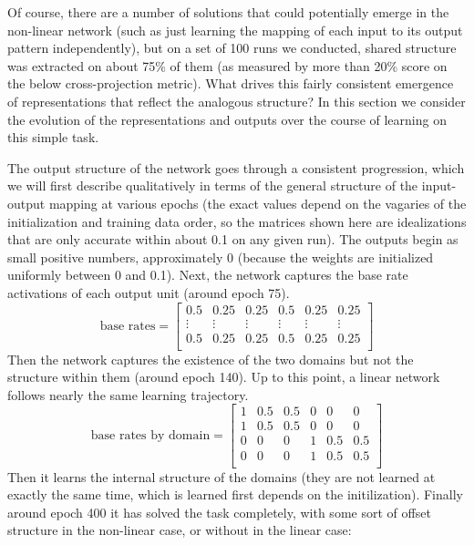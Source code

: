 \documentclass[10pt,letterpaper]{article}
\begin{document}
Of course, there are a number of solutions that could potentially emerge in the non-linear network (such as just learning the mapping of each input to its output pattern independently), but on a set of 100 runs we conducted, shared structure was extracted on about 75\% of them (as measured by more than 20\% score on the below cross-projection metric). What drives this fairly consistent emergence of representations that reflect the analogous structure? In this section we consider the evolution of the representations and outputs over the course of learning on this simple task. \par 
The output structure of the network goes through a consistent progression, which we will first describe qualitatively in terms of the general structure of the input-output mapping at various epochs (the exact values depend on the vagaries of the initialization and training data order, so the matrices shown here are idealizations that are only accurate within about 0.1 on any given run). The outputs begin as small positive numbers, approximately 0 (because the weights are initialized uniformly between 0 and 0.1). Next, the network captures the base rate activations of each output unit (around epoch 75).
{ 
\[ 
\text{base rates} = \left[ \begin{matrix} 
0.5 & 0.25 & 0.25 & 0.5 & 0.25 & 0.25 \\
\vdots & \vdots &\vdots &\vdots &\vdots &\vdots \\
 0.5 & 0.25 & 0.25 & 0.5 & 0.25 & 0.25\\
\end{matrix}  \right] 
\] 
}
Then the network captures the existence of the two domains but not the structure within them (around epoch 140). Up to this point, a linear network follows nearly the same learning trajectory.
{ 
\[
\text{base rates by domain} = \left[ \begin{matrix} 
1 & 0.5 & 0.5 & 0 & 0 & 0 \\
1 & 0.5 & 0.5 & 0 & 0 & 0 \\
0 & 0 & 0 & 1 & 0.5 & 0.5  \\
0 & 0 & 0 & 1 & 0.5 & 0.5  \\
\end{matrix}  \right] 
\] 
}
Then it learns the internal structure of the domains (they are not learned at exactly the same time, which is learned first depends on the initilization). Finally around epoch 400 it has solved the task completely, with some sort of offset structure in the non-linear case, or without in the linear case:
\end{document}

